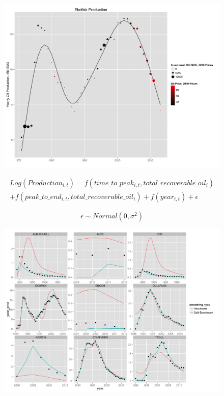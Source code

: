 \documentclass{beamer}
\begin{document}
\begin{frame}[plain]
	\begin{figure}
	\includegraphics[width=1\textwidth]{ekofisk_plot.png}
	\end{figure}
\end{frame}

\begin{frame}[plain]
	\begin{multline}
	\nonumber Log(Production_{i,t})=f(time\_to\_peak_{i,t}, total\_recoverable\_oil_i) \\
	+ f(peak\_to\_end_{i,t}, total\_recoverable\_oil_i)
	+ f(year_{i,t}) + \epsilon
	\end{multline}

	\begin{equation}
		\nonumber \epsilon \sim Normal(0, \sigma^2)
		\end{equation}
\end{frame}

\begin{frame}[plain]
	\begin{figure}
	\includegraphics[width=1\textwidth]{bench_vs_split.png}
	\end{figure}
	
\end{frame}
\end{document}
